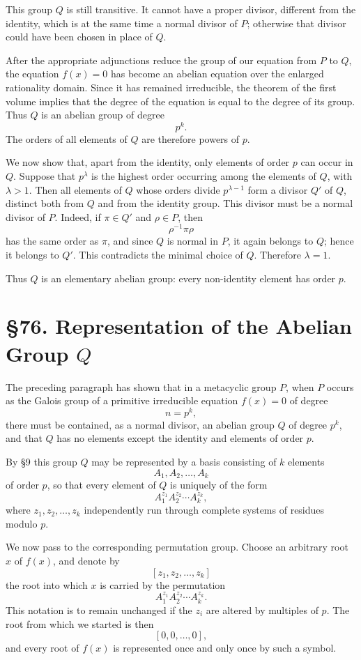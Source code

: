 \documentclass[11pt,a4paper]{book}
\newcommand{\webersection}[2]{\clearpage\section*{\S #1. #2}}
\begin{document}
This group \(Q\) is still transitive.  It cannot have a proper divisor, different from the identity, which is at the same time a normal divisor of \(P\); otherwise that divisor could have been chosen in place of \(Q\).

After the appropriate adjunctions reduce the group of our equation from \(P\) to \(Q\), the equation \(f(x)=0\) has become an abelian equation over the enlarged rationality domain.  Since it has remained irreducible, the theorem of the first volume implies that the degree of the equation is equal to the degree of its group.  Thus \(Q\) is an abelian group of degree
\[
 p^k .
\]
The orders of all elements of \(Q\) are therefore powers of \(p\).

We now show that, apart from the identity, only elements of order \(p\) can occur in \(Q\).  Suppose that \(p^\lambda\) is the highest order occurring among the elements of \(Q\), with \(\lambda>1\).  Then all elements of \(Q\) whose orders divide \(p^{\lambda-1}\) form a divisor \(Q'\) of \(Q\), distinct both from \(Q\) and from the identity group.  This divisor must be a normal divisor of \(P\).  Indeed, if \(\pi\in Q'\) and \(\rho\in P\), then
\[
 \rho^{-1}\pi\rho
\]
has the same order as \(\pi\), and since \(Q\) is normal in \(P\), it again belongs to \(Q\); hence it belongs to \(Q'\).  This contradicts the minimal choice of \(Q\).  Therefore \(\lambda=1\).

Thus \(Q\) is an elementary abelian group: every non-identity element has order \(p\).

\webersection{76}{Representation of the Abelian Group \(Q\)}

The preceding paragraph has shown that in a metacyclic group \(P\), when \(P\) occurs as the Galois group of a primitive irreducible equation \(f(x)=0\) of degree
\[
 n=p^k,
\]
there must be contained, as a normal divisor, an abelian group \(Q\) of degree \(p^k\), and that \(Q\) has no elements except the identity and elements of order \(p\).

By \S 9 this group \(Q\) may be represented by a basis consisting of \(k\) elements
\[
 A_1,A_2,\ldots,A_k
\]
of order \(p\), so that every element of \(Q\) is uniquely of the form
\[
 A_1^{z_1}A_2^{z_2}\cdots A_k^{z_k},
\]
where \(z_1,z_2,\ldots,z_k\) independently run through complete systems of residues modulo \(p\).

We now pass to the corresponding permutation group.  Choose an arbitrary root \(x\) of \(f(x)\), and denote by
\[
 [z_1,z_2,\ldots,z_k]
\]
the root into which \(x\) is carried by the permutation
\[
 A_1^{z_1}A_2^{z_2}\cdots A_k^{z_k}.
\]
This notation is to remain unchanged if the \(z_i\) are altered by multiples of \(p\).  The root from which we started is then
\[
 [0,0,\ldots,0],
\]
and every root of \(f(x)\) is represented once and only once by such a symbol.
\end{document}
